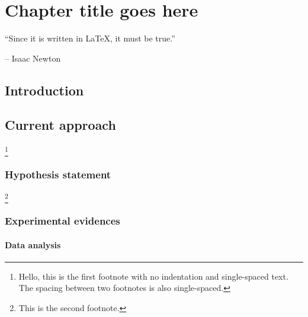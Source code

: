 \chapter{Chapter title goes here} \label{chap:chap-3}



\epigraph{\enquote{Since it is written in \LaTeX, it must be true.}}{-- Isaac Newton}




\section{Introduction}
\blindtext 


\section{Current approach}
\blindtext\footnote{Hello, this is the first footnote with no indentation and single-spaced text. The spacing between two footnotes is also single-spaced.}

\subsection{Hypothesis statement}
\blindtext\footnote{This is the second footnote.}


\subsection{Experimental evidences}
\blindtext


\subsubsection{Data analysis}
\blindtext